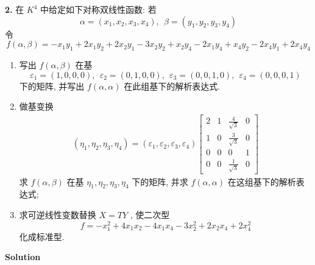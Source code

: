 \documentclass[11pt,a4paper,openany,oneside]{book}
\newcommand\Solution{\noindent\textbf{\textsf{Solution}}\par\medskip}
\begin{document}
\begin{myexample}
	\textbf{2.} 在 $ K^4 $ 中给定如下对称双线性函数: 若
 $$  \alpha = (x_1, x_2, x_3, x_4), \ \ \beta = (y_1, y_2, y_3, y_4)  $$ 
令
 $$  f(\alpha, \beta) = -x_1y_1 + 2x_1y_2 + 2x_2y_1 - 3x_2y_2 + x_2y_4 - 2x_1y_4 + x_4y_2 - 2x_4y_1 + 2x_4y_4  $$ 
 \begin{enumerate}[(1)]
 \item 写出 $ f(\alpha, \beta) $ 在基
 $$  \varepsilon_1=(1,0,0,0), \ \ \varepsilon_2 =(0,1,0,0), \ \ \varepsilon_3=(0,0,1,0), \ \ \varepsilon_4=(0,0,0,1)  $$ 
 下的矩阵, 并写出 $ f(\alpha, \alpha) $ 在此组基下的解析表达式. 
 
 \item 做基变换
 \begin{gather*}
 (\eta_1, \eta_2, \eta_3, \eta_4) = (\varepsilon_1, \varepsilon_2, \varepsilon_3, \varepsilon_4)
 \begin{bmatrix}
 2  &  1  &  \tfrac{4}{\sqrt{3}} &  0  \\
 1  &  0  &  \tfrac{3}{\sqrt{3}} &  0  \\
 0  &  0  &  0  &  1  \\
 0  &  0  &  \tfrac{1}{\sqrt{3}} & 0
 \end{bmatrix}
 \end{gather*}
 求 $ f(\alpha, \beta) $ 在基 $ \eta_1, \eta_2, \eta_3, \eta_4 $ 下的矩阵, 并求 $ f(\alpha, \alpha) $ 在这组基下的解析表达式;
 
 \item 求可逆线性变数替换 $ X=TY $ , 使二次型
 $$  f = -x_1^2 + 4x_1x_2 - 4x_1x_4 - 3x_2^2 + 2x_2x_4 + 2x_4^2  $$ 
 化成标准型. 
 \end{enumerate}
\end{myexample}
\Solution 
\end{document}
